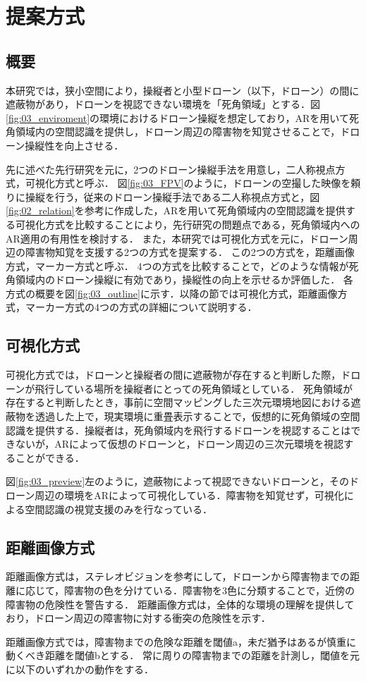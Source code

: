 \documentclass[submit]{ipsj}
\begin{document}
\section{提案方式}
\subsection{概要}
本研究では，狭小空間により，操縦者と小型ドローン（以下，ドローン）の間に遮蔽物があり，ドローンを視認できない環境を「死角領域」とする．図\ref{fig:03_enviroment}の環境におけるドローン操縦を想定しており，ARを用いて死角領域内の空間認識を提供し，ドローン周辺の障害物を知覚させることで，ドローン操縦性を向上させる．
\par
先に述べた先行研究\cite{article-ar05}を元に，2つのドローン操縦手法を用意し，二人称視点方式，可視化方式と呼ぶ．
図\ref{fig:03_FPV}のように，ドローンの空撮した映像を頼りに操縦を行う，従来のドローン操縦手法である二人称視点方式と，図\ref{fig:02_relation}を参考に作成した，ARを用いて死角領域内の空間認識を提供する可視化方式を比較することにより，先行研究の問題点である，死角領域内へのAR適用の有用性を検討する．
また，本研究では可視化方式を元に，ドローン周辺の障害物知覚を支援する2つの方式を提案する．
この2つの方式を，距離画像方式，マーカー方式と呼ぶ．
4つの方式を比較することで，どのような情報が死角領域内のドローン操縦に有効であり，操縦性の向上を示せるか評価した．
各方式の概要を図\ref{fig:03_outline}に示す．以降の節では可視化方式，距離画像方式，マーカー方式の4つの方式の詳細について説明する．

\subsection{可視化方式}
可視化方式では，ドローンと操縦者の間に遮蔽物が存在すると判断した際，ドローンが飛行している場所を操縦者にとっての死角領域としている．
死角領域が存在すると判断したとき，事前に空間マッピングした三次元環境地図における遮蔽物を透過した上で，現実環境に重畳表示することで，仮想的に死角領域の空間認識を提供する．操縦者は，死角領域内を飛行するドローンを視認することはできないが，ARによって仮想のドローンと，ドローン周辺の三次元環境を視認することができる．
\par
図\ref{fig:03_preview}左のように，遮蔽物によって視認できないドローンと，そのドローン周辺の環境をARによって可視化している．障害物を知覚せず，可視化による空間認識の視覚支援のみを行なっている．


\subsection{距離画像方式}
距離画像方式は，ステレオビジョンを参考にして，ドローンから障害物までの距離に応じて，障害物の色を分けている．障害物を3色に分類することで，近傍の障害物の危険性を警告する．
距離画像方式は，全体的な環境の理解を提供しており，ドローン周辺の障害物に対する衝突の危険性を示す．
\par
距離画像方式では，障害物までの危険な距離を閾値a，未だ猶予はあるが慎重に動くべき距離を閾値bとする．
常に周りの障害物までの距離を計測し，閾値を元に以下のいずれかの動作をする．
\end{document}
